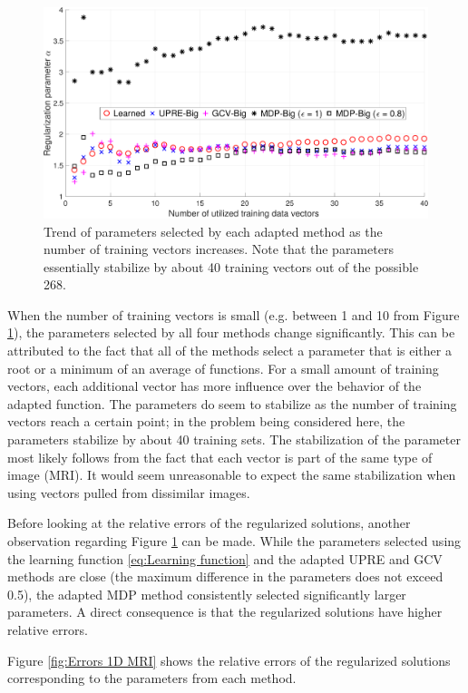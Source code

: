 \documentclass[12pt]{article}
\begin{document}
\begin{figure}[ht]
\includegraphics[width=1.0\textwidth]{Figures/Parameters1D_mri.pdf}
\caption{Trend of parameters selected by each adapted method as the number of training vectors increases. Note that the parameters essentially stabilize by about 40 training vectors out of the possible 268.}
\label{fig:Parameters 1D MRI}
\end{figure}

\noindent When the number of training vectors is small (e.g. between 1 and 10 from Figure \ref{fig:Parameters 1D MRI}), the parameters selected by all four methods change significantly. This can be attributed to the fact that all of the methods select a parameter that is either a root or a minimum of an average of functions. For a small amount of training vectors, each additional vector has more influence over the behavior of the adapted function. The parameters do seem to stabilize as the number of training vectors reach a certain point; in the problem being considered here, the parameters stabilize by about 40 training sets. The stabilization of the parameter most likely follows from the fact that each vector is part of the same type of image (MRI). It would seem unreasonable to expect the same stabilization when using vectors pulled from dissimilar images. \par 
Before looking at the relative errors of the regularized solutions, another observation regarding Figure \ref{fig:Parameters 1D MRI} can be made. While the parameters selected using the learning function \eqref{eq:Learning function} and the adapted UPRE and GCV methods are close (the maximum difference in the parameters does not exceed 0.5), the adapted MDP method consistently selected significantly larger parameters. A direct consequence is that the regularized solutions have higher relative errors. \par
Figure \ref{fig:Errors 1D MRI} shows the relative errors of the regularized solutions corresponding to the parameters from each method. 
\end{document}
